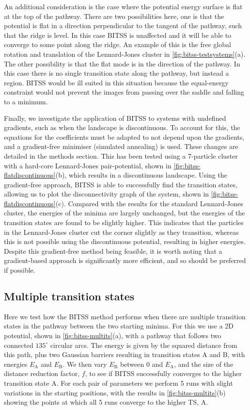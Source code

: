 An additional consideration is the case where the potential energy surface is flat at the top of the pathway.
There are two possibilities here, one is that the potential is flat in a direction perpendicular to the tangent of the pathway, such that the ridge is level.
In this case BITSS is unaffected and it will be able to converge to some point along the ridge.
An example of this is the free global rotation and translation of the Lennard-Jones cluster in \cref{fig:bitss-testsystems}(a).
The other possibility is that the flat mode is in the direction of the pathway.
In this case there is no single transition state along the pathway, but instead a region.
BITSS would be ill suited in this situation because the equal-energy constraint would not prevent the images from passing over the saddle and falling to a minimum.

Finally, we investigate the application of BITSS to systems with undefined gradients, such as when the landscape is discontinuous.
To account for this, the equations for the coefficients must be adapted to not depend upon the gradients, and a gradient-free minimiser (simulated annealing) is used.
These changes are detailed in the methods section.
This has been tested using a 7-particle cluster with a hard-core Lennard-Jones pair-potential, shown in \cref{fig:bitss-flatdiscontinuous}(b), which results in a discontinuous landscape.
Using the gradient-free approach, BITSS is able to successfully find the transition states, allowing us to plot the disconnectivity graph of the system, shown in \cref{fig:bitss-flatdiscontinuous}(c).
Compared with the results for the standard Lennard-Jones cluster, the energies of the minima are largely unchanged, but the energies of the transition states are found to be slightly higher.
This indicates that the particles in the Lennard-Jones cluster cut the corner slightly as they transition, whereas this is not possible using the discontinuous potential, resulting in higher energies.
Despite this gradient-free method being feasible, it is worth noting that a gradient-based approach is significantly more efficient, and so should be preferred if possible.


\subsection{Multiple transition states}\label{sec:bitss-multits}
Here we test how the BITSS method performs when there are multiple transition states in the pathway between the two starting minima.
For this we use a 2D potential, shown in \cref{fig:bitss-multits}(a), with a pathway that follows two connected $135^\circ$ circular arcs.
The energy is given by the squared distance from this path, plus two Gaussian barriers resulting in transition states A and B, with energies $E_\text{A}$ and $E_\text{B}$.
We then vary $E_\text{B}$ between 0 and $E_\text{A}$, and the size of the distance reduction factor, $f$, to see if BITSS successfully converges to the higher transition state A.
For each pair of parameters we perform 5 runs with slight variations in the starting positions, with the results in \cref{fig:bitss-multits}(b) showing the points at which all 5 runs converge to the higher TS, A.

